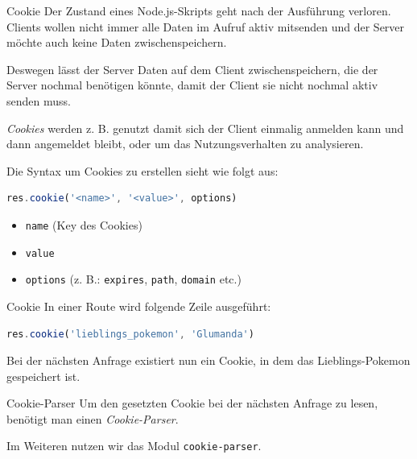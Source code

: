\begin{defi}{Cookie}
    Der Zustand eines Node.js-Skripts geht nach der Ausführung verloren.
    Clients wollen nicht immer alle Daten im Aufruf aktiv mitsenden und der Server möchte auch keine Daten zwischenspeichern.

    Deswegen lässt der Server Daten auf dem Client zwischenspeichern, die der Server nochmal benötigen könnte, damit der Client sie nicht nochmal aktiv senden muss.

    \emph{Cookies} werden z. B. genutzt damit sich der Client einmalig anmelden kann und dann angemeldet bleibt, oder um das Nutzungsverhalten zu analysieren.

    Die Syntax um Cookies zu erstellen sieht wie folgt aus:
    \begin{lstlisting}[language=JavaScript]
        res.cookie('<name>', '<value>', options)
    \end{lstlisting}

    \begin{itemize}
        \item \texttt{name} (Key des Cookies)
        \item \texttt{value}
        \item \texttt{options} (z. B.: \texttt{expires}, \texttt{path}, \texttt{domain} etc.)
    \end{itemize}
\end{defi}

\begin{example}{Cookie}
    In einer Route wird folgende Zeile ausgeführt:

    \begin{lstlisting}[language=JavaScript]
        res.cookie('lieblings_pokemon', 'Glumanda')
    \end{lstlisting}

    Bei der nächsten Anfrage existiert nun ein Cookie, in dem das Lieblings-Pokemon gespeichert ist.
\end{example}

\begin{bonus}{Cookie-Parser}
    Um den gesetzten Cookie bei der nächsten Anfrage zu lesen, benötigt man einen \emph{Cookie-Parser}.

    Im Weiteren nutzen wir das Modul \texttt{cookie-parser}.
\end{bonus}

